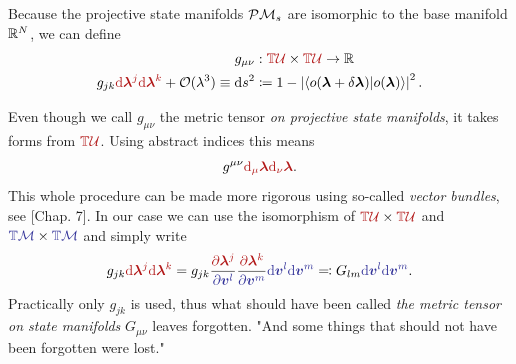 \begin{definition}
    \label{def:metricTensor}

Because the projective state manifolds $\mathcal{P}\mathcal{M}_s$ are isomorphic to the base manifold $\mathbb{R}^N$, we can define
    \begin{equation}
        \begin{split}
            g_{\mu\nu}&: \redd{\T\mathcal U}\times \redd{\T\mathcal U}\rightarrow \R \\
            g_{jk}\redd{\d \bm \lambda^j \d\bm \lambda^k}+\O(\lambda^3) \equiv \d s^2 &\coloneqq 1-\left|\braket{o(\bm\llambda+\delta\bm\llambda)|o(\bm\llambda)}\right|^2.
            \label{eq:metricTensorDef}
        \end{split}
    \end{equation} 
   
\end{definition}
Even though we call $g_{\mu\nu}$ the metric tensor \emph{on projective state manifolds}, it takes forms from $\redd{\T\mathcal U}$. Using abstract indices this means
\begin{equation}
    g^{\mu\nu}\redd{\d_\mu \llambda \d_\nu \llambda}.
\end{equation}
This whole procedure can be made more rigorous using so-called \emph{vector bundles}, see \cite{lu}[Chap. 7]. In our case we can use the isomorphism of $\redd{\T\mathcal U}\times \redd{\T\mathcal U}$ and $\bluee{\T\M}\times \bluee{\T\M}$ and simply write
\begin{equation}
    g_{jk}\redd{\d\llambda^j \d\llambda^k} = g_{jk}\frac{\redd{\partial\llambda^j}}{\bluee{\partial\bm v^l}}\frac{\redd{\partial\llambda^k}}{\bluee{\partial\bm v^m}} \bluee{\d\bm v^l \d \bm v^m} \eqqcolon G_{lm}\bluee{\d\bm v^l \d \bm v^m}.
\end{equation}
Practically only $g_{jk}$ is used, thus what should have been called \emph{the metric tensor on state manifolds} $G_{\mu\nu}$ leaves forgotten. "And some things that should not have been forgotten were lost." \citep{lordOfTheRings}







